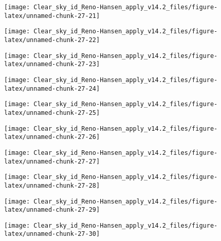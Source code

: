 \documentclass[
  10pt,
  a4paper,oneside]{article}
\begin{document}
\begin{center}\texttt{[image: Clear\_sky\_id\_Reno-Hansen\_apply\_v14.2\_files/figure-latex/unnamed-chunk-27-21]} \end{center}

\begin{center}\texttt{[image: Clear\_sky\_id\_Reno-Hansen\_apply\_v14.2\_files/figure-latex/unnamed-chunk-27-22]} \end{center}

\begin{center}\texttt{[image: Clear\_sky\_id\_Reno-Hansen\_apply\_v14.2\_files/figure-latex/unnamed-chunk-27-23]} \end{center}

\begin{center}\texttt{[image: Clear\_sky\_id\_Reno-Hansen\_apply\_v14.2\_files/figure-latex/unnamed-chunk-27-24]} \end{center}

\begin{center}\texttt{[image: Clear\_sky\_id\_Reno-Hansen\_apply\_v14.2\_files/figure-latex/unnamed-chunk-27-25]} \end{center}

\begin{center}\texttt{[image: Clear\_sky\_id\_Reno-Hansen\_apply\_v14.2\_files/figure-latex/unnamed-chunk-27-26]} \end{center}

\begin{center}\texttt{[image: Clear\_sky\_id\_Reno-Hansen\_apply\_v14.2\_files/figure-latex/unnamed-chunk-27-27]} \end{center}

\begin{center}\texttt{[image: Clear\_sky\_id\_Reno-Hansen\_apply\_v14.2\_files/figure-latex/unnamed-chunk-27-28]} \end{center}

\begin{center}\texttt{[image: Clear\_sky\_id\_Reno-Hansen\_apply\_v14.2\_files/figure-latex/unnamed-chunk-27-29]} \end{center}

\begin{center}\texttt{[image: Clear\_sky\_id\_Reno-Hansen\_apply\_v14.2\_files/figure-latex/unnamed-chunk-27-30]} \end{center}
\end{document}
